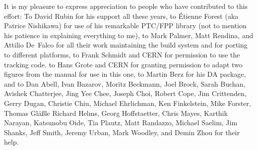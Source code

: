 It is my pleasure to express appreciation to people who have contributed to this effort:
To David Rubin for his support all these years, to \'Etienne Forest (aka Patrice
Nishikawa) for use of his remarkable PTC/FPP library (not to mention his patience in
explaining everything to me), to Mark Palmer, Matt Rendina, and Attilio De~Falco for all
their work maintaining the build system and for porting \bmad to different platforms, to
Frank Schmidt and CERN for permission to use the \mad tracking code. to Hans Grote and
CERN for granting permission to adapt two figures from the \mad manual for use in this
one, to Martin Berz for his DA package, and to Dan Abell, Ivan Bazarov, Moritz Beckmann,
Joel Brock, Sarah Buchan, Avishek Chatterjee, Jing Yee Chee, Joseph Choi, Robert Cope, Jim
Crittenden, Gerry Dugan, Christie Chiu, Michael Ehrlichman, Ken Finkelstein, Mike Forster,
Thomas Gl{\"a}{\ss}le Richard Helms, Georg Hoffstaetter, Chris Mayes, Karthik Narayan,
Katsunobu Oide, Tia Plautz, Matt Randazzo, Michael Saelim, Jim Shanks, Jeff Smith, Jeremy
Urban, Mark Woodley, and Demin Zhou for their help.

